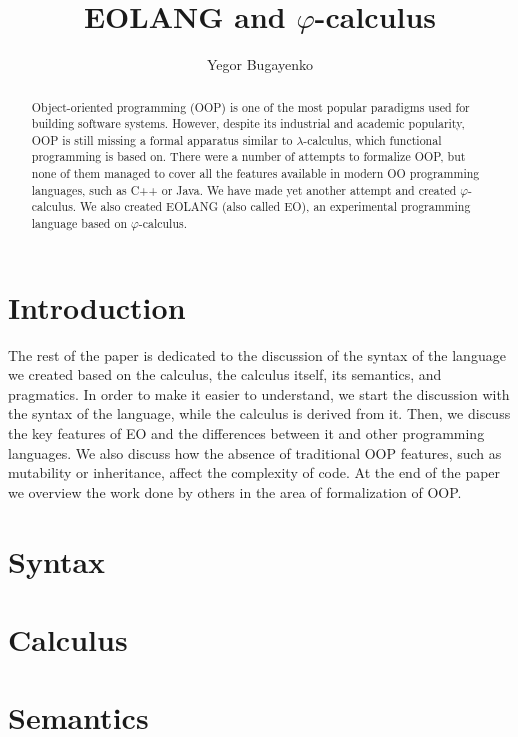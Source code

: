\documentclass[sigplan,nonacm=true]{acmart}
\title{EOLANG and $\varphi$-calculus}
\author{Yegor Bugayenko}{}{}
\affiliation{
  \institution{}
  \city{Moscow}
  \country{Russia}
}
\theoremstyle{theorems}
\newcommand\phic{{$\varphi$-calculus}}
\newcommand\eo{{\sffamily EO}}
\begin{document}
\begin{abstract}
Object-oriented programming (OOP) is one of the most popular
paradigms used for building software systems. However, despite
its industrial and academic popularity, OOP is still missing
a formal apparatus similar to $\lambda$-calculus, which functional
programming is based on. There were a number of attempts to formalize
OOP, but none of them managed to cover all the features available in
modern OO programming languages, such as C++ or Java.
We have made yet another attempt and created \phic{}. We also
created EOLANG (also called \eo{}), an experimental
programming language based on \phic{}.
\end{abstract}

\maketitle

\section{Introduction}
\label{sec:intro}



The rest of the paper is dedicated to the discussion of the
syntax of the language we created based on the calculus,
the calculus itself, its semantics, and pragmatics.
In order to make it easier to understand, we start
the discussion with the syntax of the language, while the calculus
is derived from it. Then, we discuss the
key features of \eo{} and the differences between it and other
programming languages. We also discuss how the absence of traditional
OOP features, such as mutability or inheritance, affect the complexity of code.
At the end of the paper we overview the work done by others in the area of
formalization of OOP.

\section{Syntax}
\label{sec:syntax}


\section{Calculus}
\label{sec:calculus}


\section{Semantics}
\label{sec:semantics}

\end{document}
